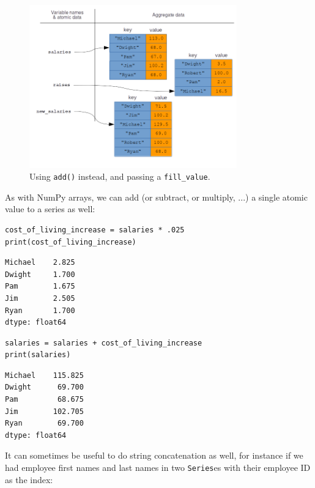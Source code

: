 \begin{figure}[ht]
\centering
\includegraphics[width=0.8\textwidth]{vectorizedPandas3.png}
\caption{Using \texttt{add()} instead, and passing a \texttt{fill\_value}.}
\label{fig:vectorizedPandas3}
\end{figure}

As with NumPy arrays, we can add (or subtract, or multiply, ...) a single
atomic value to a series as well:

\begin{Verbatim}[fontsize=\small,samepage=true,frame=single,framesep=3mm]
cost_of_living_increase = salaries * .025
print(cost_of_living_increase)
\end{Verbatim}

\begin{Verbatim}[fontsize=\small,samepage=true,frame=leftline,framesep=5mm,framerule=1mm]
Michael    2.825
Dwight     1.700
Pam        1.675
Jim        2.505
Ryan       1.700
dtype: float64
\end{Verbatim}

\begin{Verbatim}[fontsize=\small,samepage=true,frame=single,framesep=3mm]
salaries = salaries + cost_of_living_increase
print(salaries)
\end{Verbatim}

\begin{Verbatim}[fontsize=\small,samepage=true,frame=leftline,framesep=5mm,framerule=1mm]
Michael    115.825
Dwight      69.700
Pam         68.675
Jim        102.705
Ryan        69.700
dtype: float64
\end{Verbatim}

It can sometimes be useful to do string concatenation as well, for instance if
we had employee first names and last names in two \texttt{Series}es with their
employee ID as the index:

